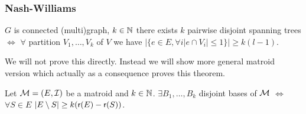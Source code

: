 \subsubsection{Nash-Williams}

\begin{thm}
	$G$ is connected (multi)graph, $k \in \mathbb{N}$ there exists $k$ pairwise disjoint spanning trees $\iff$ $\forall$ partition $V_1, \dots, V_k$ of $V$ we have $|\{e \in E, \forall i |e \cap V_i| \leq 1\}| \geq k (l-1)$.
\end{thm}

We will not prove this directly. Instead we will show more general matroid version which actually as a consequence proves this theorem.

\begin{thm}
	Let $\mathcal{M} = (E, \mathcal{I})$ be a matroid and $k \in \mathbb{N}$. $\exists B_1, \dots, B_k$ disjoint bases of $\mathcal{M}$ $\iff$ $\forall S \in E$ $|E \setminus S| \geq k (\operatorname{\textsf{r}}(E) - \operatorname{\textsf{r}}(S))$.
\end{thm}

